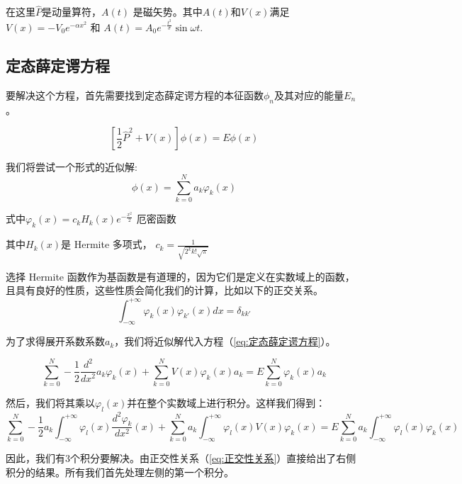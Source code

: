 \documentclass[12pt]{ctexart}
\numberwithin{equation}{section} %
\begin{document}
    在这里$\hat{P}$是动量算符，$A(t)$ 是磁矢势。其中$A(t)$和$V(x)$满足
    $V(x)=-V_0e^{-\alpha x^2}$ 和 
    $A(t)=A_0e^{-\frac{t^2}\sigma}\sin\omega t.$
\subsection{定态薛定谔方程}
    要解决这个方程，首先需要找到定态薛定谔方程的本征函数$\phi_n$及其对应的能量$E_n$。
    
    \begin{equation}
        \left[\dfrac{1}{2}\hat{P}^2+V(x)\right]\phi(x)=E\phi(x)
   \label{eq:定态薛定谔方程}
    \end{equation}
    
    我们将尝试一个形式的近似解:
    \begin{equation}\phi(x)=\sum_{k=0}^Na_k\varphi_k(x)
        \label{eq:定态薛定谔方程近似解}
    \end{equation}
        
式中$\varphi_k(x)=c_kH_k(x)e^{-\frac{x^2}2}$ 厄密函数

其中$H_k(x)$是 Hermite 多项式，
$c_k=\frac{1}{\sqrt{2^kk!\sqrt
\pi}}$

选择 Hermite 函数作为基函数是有道理的，因为它们是定义在实数域上的函数，且具有良好的性质，这些性质会简化我们的计算，比如以下的正交关系。
\begin{equation}
         \int_{-\infty}^{+\infty}\varphi_k(x)\varphi_{k'}(x)dx=\delta_{kk'}
\label{eq:正交性关系}
        \end{equation}

为了求得展开系数系数$a_k$，我们将近似解代入方程（\ref{eq:定态薛定谔方程}）。


 \begin{equation}
    \sum_{k=0}^{N}-\frac{1}{2}\frac{d^{2}}{dx^{2}}a_{k}\varphi_{k}(x)+\sum_{k=0}^{N}V(x)\varphi_{k}(x)a_{k}=E\sum_{k=0}^{N}\varphi_{k}(x)a_{k}
\end{equation}

然后，我们将其乘以$\varphi_l(x)$并在整个实数域上进行积分。这样我们得到：
\begin{equation}
     \sum_{k=0}^{N}-\frac{1}{2}a_{k}\int_{-\infty}^{+\infty}\varphi_{l}(x)\frac{d^{2}\varphi_{k}}{dx^{2}}(x)+\sum_{k=0}^{N}a_{k}\int_{-\infty}^{+\infty}\varphi_{l}(x)V(x)\varphi_{k}(x)=E\sum_{k=0}^{N}a_{k}\int_{-\infty}^{+\infty}\varphi_{l}(x)\varphi_{k}(x)
\label{eq:定态薛定谔方程近似解}
    \end{equation}

因此，我们有3个积分要解决。由正交性关系（\ref{eq:正交性关系}）直接给出了右侧积分的结果。所有我们首先处理左侧的第一个积分。
\end{document}
